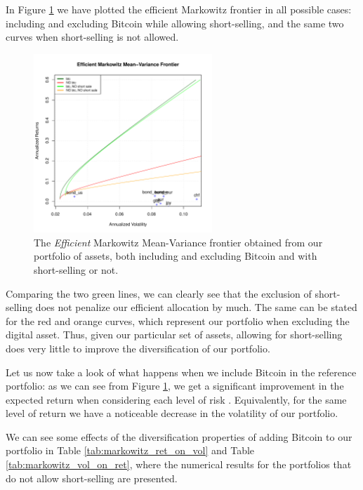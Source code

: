 In Figure \ref{fig:efficient_frontier_comparison} we have plotted the efficient Markowitz frontier in all possible cases: including and excluding Bitcoin while allowing short-selling, and the same two curves when short-selling is not allowed.
\begin{figure}
	\centering
	\includegraphics[width=0.6\textwidth]{Images/efficient_frontier.pdf}
	\caption[Markowitz Efficient frontier comparison]{The \textit{Efficient} Markowitz Mean-Variance frontier obtained from our portfolio of assets, both including and excluding Bitcoin and with short-selling or not.}
	\label{fig:efficient_frontier_comparison}
\end{figure}

Comparing the two green lines, we can clearly see that the exclusion of short-selling does not penalize our efficient allocation by much. The same can be stated for the red and orange curves, which represent our portfolio when excluding the digital asset.
Thus, given our particular set of assets, allowing for short-selling does very little to improve the diversification of our portfolio.

Let us now take a look of what happens when we include Bitcoin in the reference portfolio: as we can see from Figure \ref{fig:efficient_frontier_comparison}, we get a significant improvement in the expected return when considering each level of risk . Equivalently, for the same level of return we have a noticeable decrease in the volatility of our portfolio.


We can see some effects of the diversification properties of adding Bitcoin to our portfolio in Table \ref{tab:markowitz_ret_on_vol} and Table	\ref{tab:markowitz_vol_on_ret}, where the numerical results for the portfolios that do not allow short-selling are presented.

